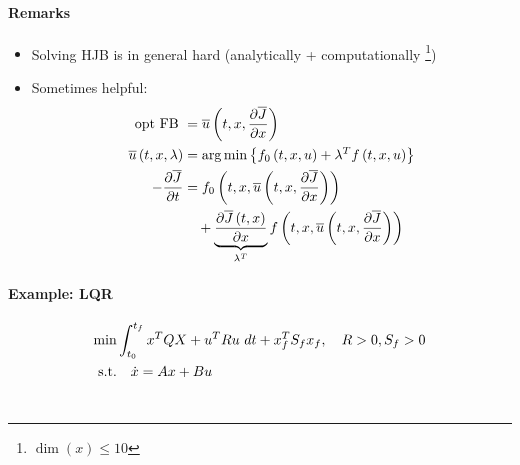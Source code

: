 \paragraph{Remarks}
\def\uval{\overline{u} \left( t,x,\frac{\partial \overline{J}}{\partial x} \right)}
\begin{itemize}
\item Solving HJB  is in general hard
    (analytically + computationally%
    \footnote{$\dim(x) \leq 10$})
\item Sometimes helpful:
    \begin{align}
    \txt{opt FB } &= \uval\\
    \ubar{t,x,\lambda} &= \argmin \set{
        f_0 \paren{\txu} + \lambda^Tf \paren{\txu}
    }
    \label{eq:hjb-umin-lambda}\\
    - \pdein{\Jbar{}}{t}
        &= f_0 \paren{t,x,\uval} \nonumber\\
        &\quad    + \underbrace{\pdein{\Jbar{t,x}}{x}}_{\lambda^T} f \paren{t,x,\uval}
            \label{eq:hjb-djdt}
    \end{align}
\end{itemize}

\paragraph{Example: LQR}
\begin{align*}
    \min    & \int_{t_0}^{t_f}  x^T Q X + u^T R u ~dt
                    + x_f^T S_f x_f,
                    \quad R >0, S_f > 0\\
    \textnormal{s.t.}     & \quad \dot{x} = Ax + Bu
\end{align*}~

